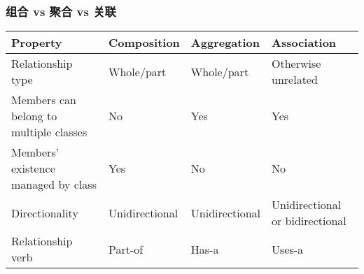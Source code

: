 \documentclass[../../LearnCpp.tex]{subfiles}
\begin{document}
\subsubsection*{组合 vs 聚合 vs 关联}

\begin{center}
    \begin{tiny}
        \begin{tabularx}{ 1\textwidth}{
                | >{\raggedright\arraybackslash}X
                | >{\raggedright\arraybackslash}X
                | >{\raggedright\arraybackslash}X
                | >{\raggedright\arraybackslash}X |
            }
            \hline
            Property                               & Composition    & Aggregation    & Association                     \\
            \hline
            Relationship type                      & Whole/part     & Whole/part     & Otherwise unrelated             \\
            Members can belong to multiple classes & No             & Yes            & Yes                             \\
            Members’ existence managed by class    & Yes            & No             & No                              \\
            Directionality                         & Unidirectional & Unidirectional & Unidirectional or bidirectional \\
            Relationship verb                      & Part-of        & Has-a          & Uses-a                          \\
            \hline
        \end{tabularx}
    \end{tiny}
\end{center}
\end{document}
